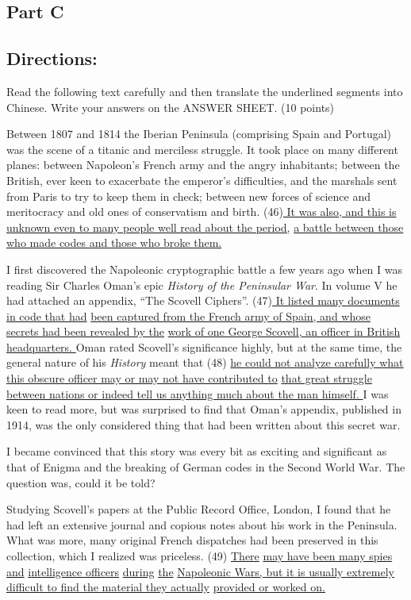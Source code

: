 \documentclass[UTF8,11pt]{ctexart}
\begin{document}
\subsection*{\textbf{Part C}}


\subsection*{\textbf{Directions:}}


Read the following text carefully and then translate the underlined segments into Chinese. Write your answers on the ANSWER SHEET. (10 points)


Between 1807 and 1814 the Iberian Peninsula (comprising Spain and Portugal) was the scene of a titanic and merciless struggle. It took place on many different planes: between Napoleon’s French army and the angry inhabitants; between the British, ever keen to exacerbate the emperor’s difficulties, and the marshals sent from Paris to try to keep them in check; between new forces of science and meritocracy and old ones of conservatism and birth. (46)\uline{ It was also, and this is unknown even to many people well read about the period,} \uline{a battle between those who made codes and those who broke them.}


I first discovered the Napoleonic cryptographic battle a few years ago when I was reading Sir Charles Oman’s epic \textit{History of the Peninsular War}. In volume V he had attached an appendix, “The Scovell Ciphers”. (47)\uline{ It listed many documents in code that had} \uline{been captured from the French army of Spain, and whose secrets had been revealed by the} \uline{work of one George Scovell, an officer in British headquarters. }Oman rated Scovell’s significance highly, but at the same time, the general nature of his \textit{History} meant that (48) \uline{he could not analyze carefully what this obscure officer may or may not have contributed to} \uline{that great struggle between nations or indeed tell us anything much about the man himself. }I was keen to read more, but was surprised to find that Oman’s appendix, published in 1914, was the only considered thing that had been written about this secret war.


I became convinced that this story was every bit as exciting and significant as that of Enigma and the breaking of German codes in the Second World War. The question was, could it be told?


Studying Scovell’s papers at the Public Record Office, London, I found that he had left an extensive journal and copious notes about his work in the Peninsula. What was more, many original French dispatches had been preserved in this collection, which I realized was priceless. (49) \uline{There} \uline{may have been many spies and} \uline{intelligence officers} \uline{during} \uline{the} \uline{Napoleonic Wars, but it is usually extremely difficult to find the material they actually} \uline{provided or worked on.}
\end{document}
